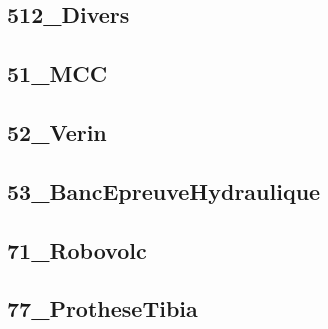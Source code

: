 \subsection{512\_Divers}
\graphicspath{{../05-Modélisation Systèmes Asservis/TD/SLCI/SchemaBlocs/512_Divers/images/}{../05-Modélisation Systèmes Asservis/TD/SLCI/SchemaBlocs/512_Divers/}{../Style/png/}}


\subsection{51\_MCC}
\graphicspath{{../05-Modélisation Systèmes Asservis/TD/SLCI/SchemaBlocs/51_MCC/images/}{../05-Modélisation Systèmes Asservis/TD/SLCI/SchemaBlocs/51_MCC/}{../Style/png/}}


\subsection{52\_Verin}
\graphicspath{{../05-Modélisation Systèmes Asservis/TD/SLCI/SchemaBlocs/52_Verin/images/}{../05-Modélisation Systèmes Asservis/TD/SLCI/SchemaBlocs/52_Verin/}{../Style/png/}}


\subsection{53\_BancEpreuveHydraulique}
\graphicspath{{../05-Modélisation Systèmes Asservis/TD/SLCI/SchemaBlocs/53_BancEpreuveHydraulique/images/}{../05-Modélisation Systèmes Asservis/TD/SLCI/SchemaBlocs/53_BancEpreuveHydraulique/}{../Style/png/}}


\subsection{71\_Robovolc}
\graphicspath{{../05-Modélisation Systèmes Asservis/TD/SLCI/SchemaBlocs/71_Robovolc/images/}{../05-Modélisation Systèmes Asservis/TD/SLCI/SchemaBlocs/71_Robovolc/}{../Style/png/}}


\subsection{77\_ProtheseTibia}
\graphicspath{{../05-Modélisation Systèmes Asservis/TD/SLCI/SchemaBlocs/77_ProtheseTibia/images/}{../05-Modélisation Systèmes Asservis/TD/SLCI/SchemaBlocs/77_ProtheseTibia/}{../Style/png/}}


